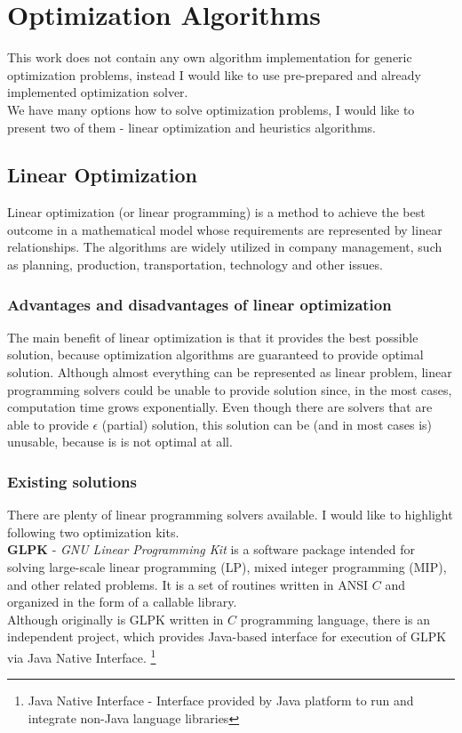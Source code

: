 
\section{Optimization Algorithms}\label{sec:optimization-algorithms}

This work does not contain any own algorithm implementation for generic optimization problems,
instead I would like to use pre-prepared and already implemented optimization solver.\\
We have many options how to solve optimization problems, I would like to present two of them
- linear optimization and heuristics algorithms.

\subsection{Linear Optimization}\label{subsec:linear-optimization}
Linear optimization (or linear programming) is a method to achieve the best outcome in a mathematical model
whose requirements are represented by linear relationships.\cite{web_wiki:linearProgramming}
The algorithms are widely utilized in company management, such as planning, production, transportation, technology and other issues.


\subsubsection{Advantages and disadvantages of linear optimization}
The main benefit of linear optimization is that it provides the best possible solution,
because optimization algorithms are guaranteed to provide optimal solution.
Although almost everything can be represented as linear problem,
linear programming solvers could be unable to provide solution since, in the most cases, computation time grows exponentially.
Even though there are solvers that are able to provide $\epsilon$ (partial) solution,
this solution can be (and in most cases is) unusable, because is is not optimal at all.

\subsubsection{Existing solutions}\label{subsec:existing-solutions-lin}
There are plenty of linear programming solvers available.
I would like to highlight following two optimization kits.\\

\textbf{GLPK} - \textit{GNU Linear Programming Kit} is a software package intended for solving large-scale linear programming (LP),
mixed integer programming (MIP), and other related problems.
It is a set of routines written in ANSI $C$ and organized in the form of a callable library.\cite{web:gnuGlpk}\\
Although originally is GLPK written in $C$ programming language,
there is an independent project,
which provides Java-based interface for execution of GLPK via Java Native Interface.
\footnote{Java Native Interface - Interface provided by Java platform to run and integrate non-Java language libraries}\\

